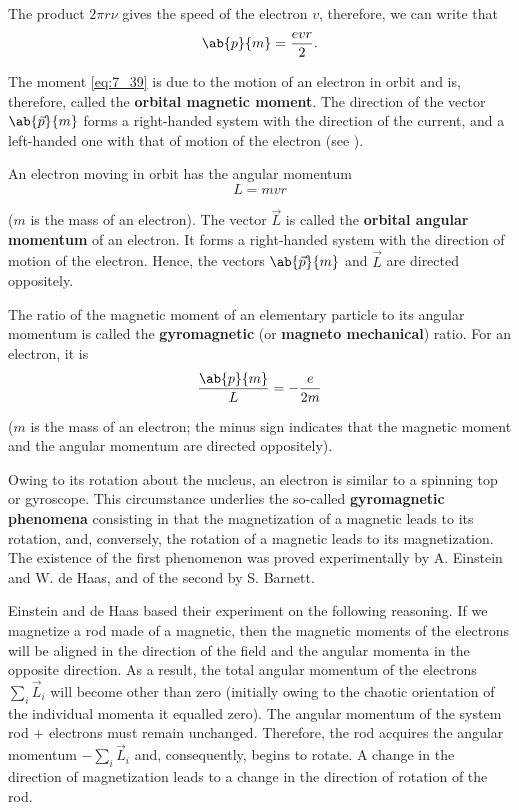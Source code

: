 \noindent
The product $2\pi r\nu$ gives the speed of the electron $v$, therefore, we can write that
\begin{equation}\label{eq:7_39}
    \ab{p}{m} = \frac{evr}{2}.
\end{equation}

\noindent
The moment \eqref{eq:7_39} is due to the motion of an electron in orbit and is, therefore, called the \textbf{orbital magnetic moment}.
The direction of the vector $\ab{\vec{p}}{m}$ forms a right-handed system with the direction of the current, and a left-handed one with that of motion of the electron (see ).

An electron moving in orbit has the angular momentum
\begin{equation}\label{eq:7_40}
    L = mvr
\end{equation}

\noindent
($m$ is the mass of an electron). The vector $\vec{L}$ is called the \textbf{orbital angular momentum} of an electron.
It forms a right-handed system with the direction of motion of the electron.
Hence, the vectors $\ab{\vec{p}}{m}$ and $\vec{L}$ are directed oppositely.

The ratio of the magnetic moment of an elementary particle to its angular momentum is called the \textbf{gyromagnetic} (or \textbf{magneto mechanical}) ratio.
For an electron, it is
\begin{equation}\label{eq:7_41}
    \frac{\ab{p}{m}}{L} = - \frac{e}{2m}
\end{equation}

\noindent
($m$ is the mass of an electron; the minus sign indicates that the magnetic moment and the angular momentum are directed oppositely).

Owing to its rotation about the nucleus, an electron is similar to a spinning top or gyroscope.
This circumstance underlies the so-called \textbf{gyromagnetic phenomena} consisting in that the magnetization of a magnetic leads to its rotation, and, conversely, the rotation of a magnetic leads to its magnetization.
The existence of the first phenomenon was proved experimentally by A. Einstein and W. de Haas, and of the second by S. Barnett.

Einstein and de Haas based their experiment on the following reasoning.
If we magnetize a rod made of a magnetic, then the magnetic moments of the electrons will be aligned in the direction of the field and the angular momenta in the opposite direction.
As a result, the total angular momentum of the electrons $\sum_i\vec{L}_i$ will become other than zero (initially owing to the chaotic orientation of the individual momenta it equalled zero).
The angular momentum of the system rod + electrons must remain unchanged.
Therefore, the rod acquires the angular momentum $-\sum_i\vec{L}_i$ and, consequently, begins to rotate.
A change in the direction of magnetization leads to a change in the direction of rotation of the rod.

